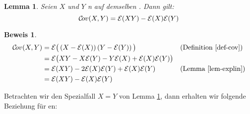 \documentclass[a4paper]{article}
\newtheorem{lemma}[satz]{Lemma}
\theoremstyle{nonumberplain}
\newtheorem{beweis}{Beweis}
\begin{document}
\begin{lemma}\label{lemma-cov-exp}
	Seien $X$ und $Y$ \rvar{}n auf demselben \probspace{}. Dann gilt:
\begin{equation}
	\mathcal{C}\!ov{}(X,Y) = \mathcal{E}(XY) - \mathcal{E}(X)\mathcal{E}(Y)
\end{equation}
\end{lemma}
\begin{beweis}
\begin{align*}
\mathcal{C}\!ov{}(X,Y) & = \mathcal{E}\big( \left(X - \mathcal{E}(X)\right)\left(Y - \mathcal{E}(Y)\right)\big) && \text{(Definition \ref{def-cov})} \\
& = \mathcal{E}\big(XY - X \mathcal{E}(Y) - Y \mathcal{E}(X) + \mathcal{E}(X)\mathcal{E}(Y)\big) \\
& = \mathcal{E}(XY) - 2 \mathcal{E}(X) \mathcal{E}(Y) + \mathcal{E}(X) \mathcal{E}(Y) && \text{(Lemma \ref{lem-explin})}\\
& = \mathcal{E}(XY) - \mathcal{E}(X)\mathcal{E}(Y) \\
\end{align*}
\end{beweis}

Betrachten wir den Spezialfall $X = Y$  von Lemma \ref{lemma-cov-exp}, dann erhalten wir folgende Beziehung für \var{}en:
\end{document}
